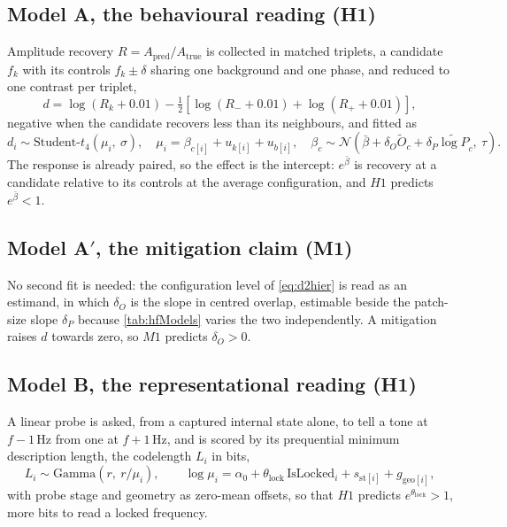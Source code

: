 \subsection*{Model A, the behavioural reading (H1)}
Amplitude recovery $R=A_{\mathrm{pred}}/A_{\mathrm{true}}$ is collected in matched triplets, a candidate $f_k$ with its controls $f_k\pm\delta$ sharing one background and one phase, and reduced to one contrast per triplet,
\begin{equation}
\label{eq:d2contrast}
d = \log(R_k + 0.01) - \tfrac{1}{2}\left[\log(R_- + 0.01) + \log(R_+ + 0.01)\right],
\end{equation}
negative when the candidate recovers less than its neighbours, and fitted as
\begin{equation}
\label{eq:d2hier}
d_i \sim \text{Student-}t_4(\mu_i,\ \sigma),
\quad
\mu_i = \beta_{c[i]} + u_{k[i]} + u_{b[i]},
\quad
\beta_c \sim \mathcal{N}\!\left(\bar\beta + \delta_O \widetilde O_c + \delta_P \widetilde{\log P}_c,\ \tau\right).
\end{equation}
The response is already paired, so the effect is the intercept: $e^{\bar\beta}$ is recovery at a candidate relative to its controls at the average configuration, and $H1$ predicts $e^{\bar\beta}<1$.

\subsection*{Model A$'$, the mitigation claim (M1)}
No second fit is needed: the configuration level of \autoref{eq:d2hier} is read as an estimand, in which $\delta_O$ is the slope in centred overlap, estimable beside the patch-size slope $\delta_P$ because \autoref{tab:hfModels} varies the two independently. A mitigation raises $d$ towards zero, so $M1$ predicts $\delta_O>0$.

\subsection*{Model B, the representational reading (H1)}
A linear probe is asked, from a captured internal state alone, to tell a tone at $f-1$\,Hz from one at $f+1$\,Hz, and is scored by its prequential minimum description length\autocite{voitaInformationTheoreticProbingMinimum2020}, the codelength $L_i$ in bits,
\begin{equation}
\label{eq:d2mdl}
L_i \sim \text{Gamma}\!\left(r,\ r/\mu_i\right),
\qquad
\log \mu_i = \alpha_0 + \theta_{\mathrm{lock}}\,\mathrm{IsLocked}_i + s_{\text{st}[i]} + g_{\text{geo}[i]},
\end{equation}
with probe stage and geometry as zero-mean offsets, so that $H1$ predicts $e^{\theta_{\mathrm{lock}}}>1$, more bits to read a locked frequency.

